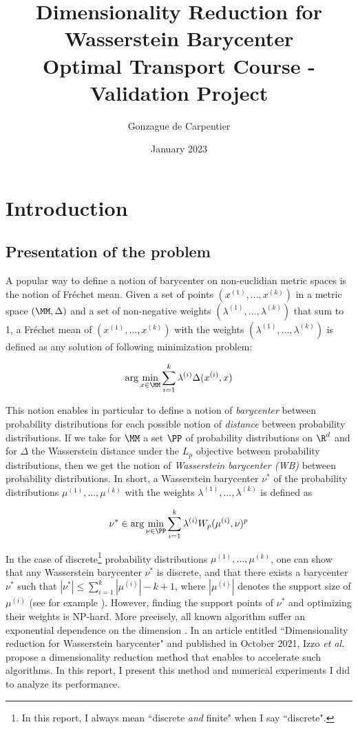 \documentclass[11pt,a4paper]{article}
\title{Dimensionality Reduction for Wasserstein Barycenter \\[1ex] \large Optimal Transport Course - Validation Project}
\author{Gonzague de Carpentier}
\date{January 2023}
\begin{document}
\maketitle

\section{Introduction}

\subsection{Presentation of the problem}

A popular way to define a notion of barycenter on non-euclidian metric spaces is the notion of Fréchet mean. Given a set of points $(x^{(1)}, ..., x^{(k)})$ in a metric space $(\MM, \Delta)$ and a set of non-negative weights $(\lambda^{(1)}, ..., \lambda^{(k)})$ that sum to 1, a Fréchet mean of $(x^{(1)}, ..., x^{(k)})$ with the weights $(\lambda^{(1)}, ..., \lambda^{(k)})$ is defined as any solution of following minimization problem:

$$\arg \min_{x \in \MM} \sum_{i=1}^k \lambda^{(i)} \Delta(x^{(i)}, x)$$

This notion enables in particular to define a notion of \emph{barycenter} between probability distributions for each possible notion of \emph{distance} between probability distributions. If we take for $\MM$ a set $\PP$ of probability distributions on $\R^d$ and for $\Delta$ the Wasserstein distance under the $L_p$ objective between probability distributions, then we get the notion of \emph{Wasserstein barycenter (WB)} between probability distributions. In short, a Wasserstein barycenter $\nu^*$ of the probability distributions $\mu^{(1)}, ..., \mu^{(k)}$ with the weights $\lambda^{(1)}, ..., \lambda^{(k)}$ is defined as

$$\nu^* \in \arg \min_{\nu \in \PP} \sum_{i=1}^k \lambda^{(i)} W_p(\mu^{(i)}, \nu)^p$$

In the case of discrete\footnote{In this report, I always mean ``discrete \emph{and} finite" when I say ``discrete".} probability distributions $\mu^{(1)}, ..., \mu^{(k)}$, one can show that any Wasserstein barycenter $\nu^*$ is discrete, and that there exists a barycenter $\nu^*$ such that $|\nu^*| \leq \sum_{i=1}^k |\mu^{(i)}| - k + 1$, where $|\mu^{(i)}|$ denotes the support size of $\mu^{(i)}$ (see for example \cite{borgwardt_computational_2022}). However, finding the support points of $\nu^*$ and optimizing their weights is NP-hard. More precisely, all known algorithm suffer an exponential dependence on the dimension \cite{altschuler_wasserstein_2022}. In an article entitled ``Dimensionality reduction for Wasserstein barycenter" \cite{izzo_dimensionality_2021} and published in October 2021, Izzo \emph{et al.} propose a dimensionality reduction method that enables to accelerate such algorithms. In this report, I present this method and numerical experiments I did to analyze its performance.
\end{document}
